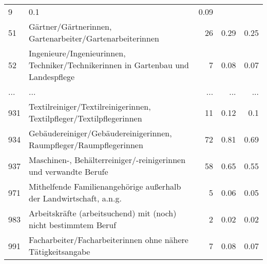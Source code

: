 \begin{longtable}{lXrrr}
          \num{9} &
          \num[round-mode=places,round-precision=2]{0,1} &
          \num[round-mode=places,round-precision=2]{0,09} \\
        51 & \multicolumn{1}{X}{Gärtner/Gärtnerinnen, Gartenarbeiter/Gartenarbeiterinnen} & %
          \num{26} &
          \num[round-mode=places,round-precision=2]{0,29} &
          \num[round-mode=places,round-precision=2]{0,25} \\
        52 & \multicolumn{1}{X}{Ingenieure/Ingenieurinnen, Techniker/Technikerinnen in Gartenbau und Landespflege} & %
          \num{7} &
          \num[round-mode=places,round-precision=2]{0,08} &
          \num[round-mode=places,round-precision=2]{0,07} \\
       ... & ... & ... & ... & ... \\
        931 & \multicolumn{1}{X}{Textilreiniger/Textilreinigerinnen, Textilpfleger/Textilpflegerinnen} & %
          \num{11} &
          \num[round-mode=places,round-precision=2]{0,12} &
          \num[round-mode=places,round-precision=2]{0,1} \\

        934 & \multicolumn{1}{X}{Gebäudereiniger/Gebäudereinigerinnen, Raumpfleger/Raumpflegerinnen} & %
          \num{72} &
          \num[round-mode=places,round-precision=2]{0,81} &
          \num[round-mode=places,round-precision=2]{0,69} \\

        937 & \multicolumn{1}{X}{Maschinen-, Behälterreiniger/-reinigerinnen und verwandte Berufe} & %
          \num{58} &
          \num[round-mode=places,round-precision=2]{0,65} &
          \num[round-mode=places,round-precision=2]{0,55} \\

        971 & \multicolumn{1}{X}{Mithelfende Familienangehörige außerhalb der Landwirtschaft, a.n.g.} & %
          \num{5} &
          \num[round-mode=places,round-precision=2]{0,06} &
          \num[round-mode=places,round-precision=2]{0,05} \\

        983 & \multicolumn{1}{X}{Arbeitskräfte (arbeitsuchend) mit (noch) nicht bestimmtem Beruf} & %
          \num{2} &
          \num[round-mode=places,round-precision=2]{0,02} &
          \num[round-mode=places,round-precision=2]{0,02} \\

        991 & \multicolumn{1}{X}{Facharbeiter/Facharbeiterinnen ohne nähere Tätigkeitsangabe} & %
          \num{7} &
          \num[round-mode=places,round-precision=2]{0,08} &
          \num[round-mode=places,round-precision=2]{0,07} \\


\end{longtable}

